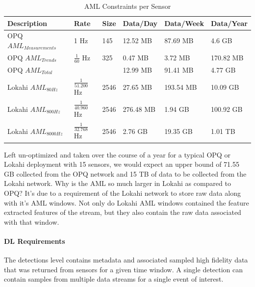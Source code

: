 \begin{table}[H]
	\centering
	\caption{AML Constraints per Sensor}
	\begin{tabularx}{\textwidth}{Xlllll}
		\toprule
		\textbf{Description} & \textbf{Rate} & \textbf{Size} & \textbf{Data/Day} & \textbf{Data/Week} & \textbf{Data/Year} \\
		\midrule
		OPQ $AML_{Measurements}$ 	& 1 Hz 					& 145 			& 12.52 MB 	& 87.69 MB 	& 4.6 GB 	\\
		OPQ $AML_{Trends}$ 			& $\frac{1}{60}$ Hz 	& 325 			& 0.47 MB 	& 3.72 MB  	& 170.82 MB \\
		OPQ $AML_{Total}$ 			&   					&   			& 12.99 MB 	& 91.41 MB 	& 4.77 GB 	\\
		Lokahi $AML_{80Hz}$			& $\frac{1}{51.200}$ Hz	& 2546  		& 27.65 MB 	& 193.54 MB & 10.09 GB	\\
		Lokahi $AML_{800Hz}$		& $\frac{1}{40.960}$ Hz	& 2546		& 276.48 MB & 1.94 GB 	& 100.92 GB \\
		Lokahi $AML_{8000Hz}$		& $\frac{1}{32.768}$ Hz	& 2546		& 2.76 GB 	& 19.35 GB 	& 1.01 TB 	\\
		\bottomrule
	\end{tabularx}
	\label{table:aml_size}
\end{table}

Left un-optimized and taken over the course of a year for a typical OPQ or Lokahi deployment with 15 sensors, we would expect an upper bound of 71.55 GB collected from the OPQ network and 15 TB of data to be collected from the Lokahi network. Why is the AML so much larger in Lokahi as compared to OPQ? It's due to a requirement of the Lokahi network to store raw data along with it's AML windows. Not only do Lokahi AML windows contained the feature extracted features of the stream, but they also contain the raw data associated with that window.

\paragraph{DL Requirements}
The detections level contains metadata and associated sampled high fidelity data that was returned from sensors for a given time window. A single detection can contain samples from multiple data streams for a single event of interest.


